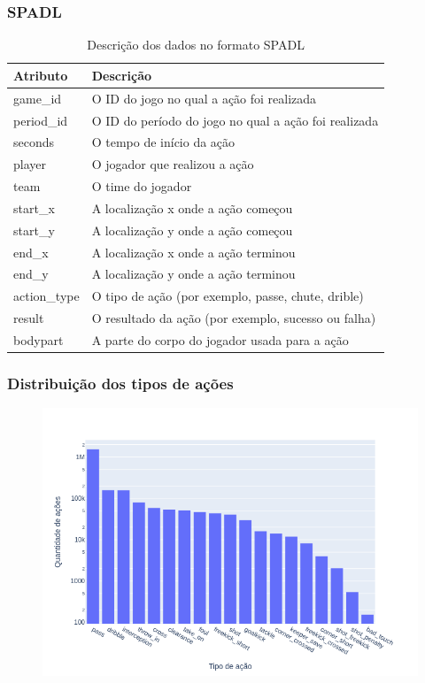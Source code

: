 \documentclass{beamer}
\begin{document}
\begin{frame}
\frametitle{SPADL}
\begin{table}[H]
\centering
\begin{tabular}{|l|l|}
\hline
\textbf{Atributo} & \textbf{Descrição} \\
\hline
game\_id & O ID do jogo no qual a ação foi realizada \\
\hline
period\_id & O ID do período do jogo no qual a ação foi realizada \\
\hline
seconds & O tempo de início da ação \\
\hline
player & O jogador que realizou a ação \\
\hline
team & O time do jogador \\
\hline
start\_x & A localização x onde a ação começou \\
\hline
start\_y & A localização y onde a ação começou \\
\hline
end\_x & A localização x onde a ação terminou \\
\hline
end\_y & A localização y onde a ação terminou \\
\hline
action\_type & O tipo de ação (por exemplo, passe, chute, drible) \\
\hline
result & O resultado da ação (por exemplo, sucesso ou falha) \\
\hline
bodypart & A parte do corpo do jogador usada para a ação \\
\hline
\end{tabular}
\caption{Descrição dos dados no formato SPADL}
\end{table}
\end{frame}

\begin{frame}
    \frametitle{Distribuição dos tipos de ações}
\begin{figure}[H]
\centering
\includegraphics[width=\linewidth]{../report/images/action_distribution.png}
\end{figure}
\end{frame}
\end{document}
